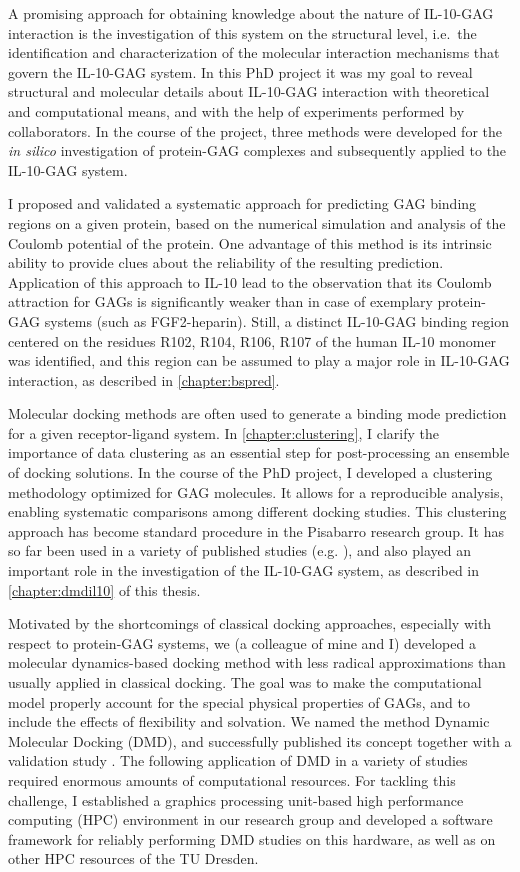 A promising approach for obtaining knowledge about the nature of IL-10-GAG
interaction is the investigation of this system on the structural level, i.e.\
the identification and characterization of the molecular interaction mechanisms
that govern the IL-10-GAG system. In this PhD project it was my goal to reveal
structural and molecular details about IL-10-GAG interaction with theoretical
and computational means, and with the help of experiments performed by
collaborators. In the course of the project, three methods were developed for
the \textit{in silico} investigation of protein-GAG complexes and subsequently
applied to the IL-10-GAG system.

I proposed and validated a systematic approach for predicting GAG binding
regions on a given protein, based on the numerical simulation and analysis of
the Coulomb potential of the protein. One advantage of this method is its
intrinsic ability to provide clues about the reliability of the resulting
prediction. Application of this approach to IL-10 lead to the observation that
its Coulomb attraction for GAGs is significantly weaker than in case of
exemplary protein-GAG systems (such as FGF2-heparin). Still, a distinct
IL-10-GAG binding region centered on the residues R102, R104, R106, R107 of the
human IL-10 monomer was identified, and this region can be assumed to play a
major role in IL-10-GAG interaction, as described in \cref{chapter:bspred}.

Molecular docking methods are often used to generate a binding mode prediction
for a given receptor-ligand system. In \cref{chapter:clustering}, I clarify the
importance of data clustering as an essential step for post-processing an
ensemble of docking solutions. In the course of the PhD project, I developed a
clustering methodology optimized for GAG molecules. It allows for a reproducible
analysis, enabling systematic comparisons among different docking studies. This
clustering approach has become standard procedure in the Pisabarro research
group. It has so far been used in a variety of published studies (e.g.
\cite{franz_cathepsin_2013}), and also played an important role in the
investigation of the IL-10-GAG system, as described in \cref{chapter:dmdil10} of
this thesis.

Motivated by the shortcomings of classical docking approaches, especially with
respect to protein-GAG systems, we (a colleague of mine and I) developed a
molecular dynamics-based docking method with less radical approximations than
usually applied in classical docking. The goal was to make the computational
model properly account for the special physical properties of GAGs, and to
include the effects of flexibility and solvation. We named the method Dynamic
Molecular Docking (DMD), and successfully published its concept together with a
validation study \cite{dmd_samsonov_gehrcke_2014}. The following application of
DMD in a variety of studies required enormous amounts of computational
resources. For tackling this challenge, I established a graphics processing
unit-based high performance computing (HPC) environment in our research group
and developed a software framework for reliably performing DMD studies on this
hardware, as well as on other HPC resources of the TU Dresden.

